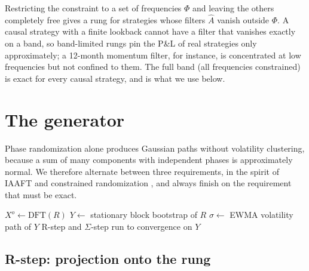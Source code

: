 \documentclass[11pt]{article}
\theoremstyle{definition}
\theoremstyle{remark}
\begin{document}
Restricting the constraint to a set of frequencies $\Phi$ and leaving the others completely free gives a rung for strategies whose filters $\hat A$ vanish
outside $\Phi$. A causal strategy with a finite lookback cannot have a filter that vanishes exactly on a band, so band-limited rungs pin the P\&L of real
strategies only approximately; a 12-month momentum filter, for instance, is concentrated at low frequencies but not confined to them. The full band
(all frequencies constrained) is exact for every causal strategy, and is what we use below.

\section{The generator}
\label{sec:generator}

Phase randomization alone produces Gaussian paths without volatility clustering, because a sum of many components with independent phases is
approximately normal. We therefore alternate between three requirements, in the spirit of IAAFT \citep{schreiber1996} and constrained randomization
\citep{schreiber1998}, and always finish on the requirement that must be exact.

\begin{algorithm}[t]
\caption{Rung generator}\label{alg:generator}
$X^{o}\leftarrow\mathrm{DFT}(R)$\;
$Y\leftarrow$ stationary block bootstrap of $R$ 
$\sigma\leftarrow$ EWMA volatility path of $Y$ 
\Return R-step and $\Sigma$-step run to convergence on $Y$ 
\end{algorithm}

\subsection{R-step: projection onto the rung}
\end{document}
